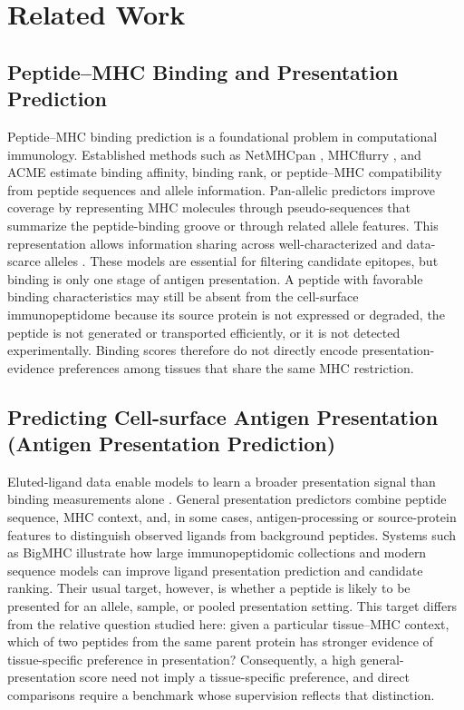 \section{Related Work}

\subsection{Peptide--MHC Binding and Presentation Prediction}

Peptide--MHC binding prediction is a foundational problem in computational immunology. Established methods such as NetMHCpan \cite{reynisson2020netmhcpan}, MHCflurry \cite{odonnell2020mhcflurry}, and ACME \cite{hu2019acme} estimate binding affinity, binding rank, or peptide--MHC compatibility from peptide sequences and allele information. Pan-allelic predictors improve coverage by representing MHC molecules through pseudo-sequences that summarize the peptide-binding groove or through related allele features. This representation allows information sharing across well-characterized and data-scarce alleles \cite{nielsen2007netmhcpan,reynisson2020netmhcpan}. These models are essential for filtering candidate epitopes, but binding is only one stage of antigen presentation. A peptide with favorable binding characteristics may still be absent from the cell-surface immunopeptidome because its source protein is not expressed or degraded, the peptide is not generated or transported efficiently, or it is not detected experimentally. Binding scores therefore do not directly encode presentation-evidence preferences among tissues that share the same MHC restriction.

\subsection{Predicting Cell-surface Antigen Presentation (Antigen Presentation Prediction)}

Eluted-ligand data enable models to learn a broader presentation signal than binding measurements alone \cite{reynisson2020netmhcpan,odonnell2020mhcflurry}. General presentation predictors combine peptide sequence, MHC context, and, in some cases, antigen-processing or source-protein features to distinguish observed ligands from background peptides. Systems such as BigMHC \cite{albert2023bigmhc} illustrate how large immunopeptidomic collections and modern sequence models can improve ligand presentation prediction and candidate ranking. Their usual target, however, is whether a peptide is likely to be presented for an allele, sample, or pooled presentation setting. This target differs from the relative question studied here: given a particular tissue--MHC context, which of two peptides from the same parent protein has stronger evidence of tissue-specific preference in presentation? Consequently, a high general-presentation score need not imply a tissue-specific preference, and direct comparisons require a benchmark whose supervision reflects that distinction.

